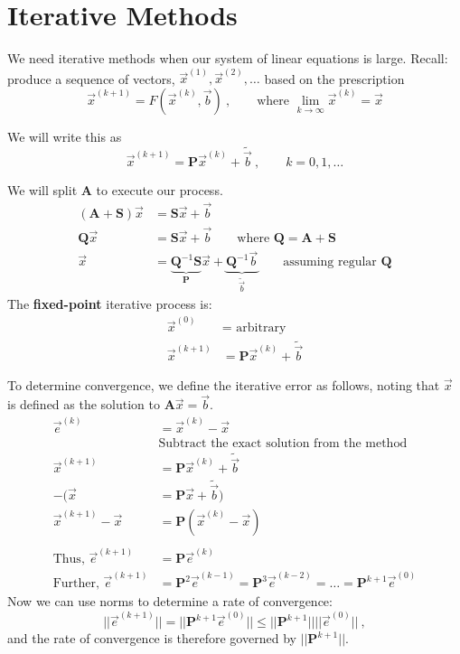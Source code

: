 \documentclass[12pt]{article}
\newcommand{\ve}[1]{\ensuremath{\mathbf{#1}}}
\begin{document}
\section*{Iterative Methods}
We need iterative methods when our system of linear equations is large. Recall: produce a sequence of vectors, $\vec{x}^{(1)}, \vec{x}^{(2)}, \dots$ based on the prescription
  \[\vec{x}^{(k+1)} = F(\vec{x}^{(k)}, \vec{b})\:, \qquad \text{where } \displaystyle \lim_{k \rightarrow \infty} \vec{x}^{(k)} = \vec{x}\] 

We will write this as \[\vec{x}^{(k+1)} = \ve{P}\vec{x}^{(k)} +  \tilde{\vec{b}}\:,\qquad k = 0, 1, \dots \]

We will split $\ve{A}$ to execute our process.
%
\begin{align}
(\ve{A} + \ve{S}) \vec{x} &= \ve{S}\vec{x} + \vec{b} \nonumber \\
%
\ve{Q} \vec{x} &= \ve{S}\vec{x} + \vec{b} 
\qquad\text{where } \ve{Q} = \ve{A} + \ve{S} \nonumber \\
%
\vec{x} &= \underbrace{\ve{Q}^{-1} \ve{S}}_{\ve{P}}\vec{x} + \underbrace{\ve{Q}^{-1} \vec{b}}_{\tilde{\vec{b}} }
\qquad\text{assuming regular } \ve{Q}\nonumber
\end{align}
%
The \textbf{fixed-point} iterative process is:
\begin{align}
\vec{x}^{(0)} &= \text{ arbitrary}\nonumber \\
\vec{x}^{(k+1)} &= \ve{P}\vec{x}^{(k)} + \tilde{\vec{b}} \nonumber
\end{align}

To determine convergence, we define the iterative error as follows, noting that $\vec{x}$ is defined as the solution to $\ve{A}\vec{x} = \vec{b}$. 
%
\begin{align}
\vec{e}^{(k)} &= \vec{x}^{(k)} - \vec{x} \nonumber \\
%
&\text{Subtract the exact solution from the method} \nonumber \\
%
\vec{x}^{(k+1)} &= \ve{P}\vec{x}^{(k)} + \tilde{\vec{b}} \nonumber \\
- (\vec{x} &= \ve{P}\vec{x} + \tilde{\vec{b}}) \nonumber \\
%
\vec{x}^{(k+1)} - \vec{x} &= \ve{P}(\vec{x}^{(k)} - \vec{x})\nonumber \\
%
\nonumber \\
%
\text{Thus, } \vec{e}^{(k+1)} &= \ve{P}\vec{e}^{(k)} \nonumber \\
%
\text{Further, } \vec{e}^{(k+1)} &= \ve{P}^2\vec{e}^{(k-1)} = \ve{P}^3\vec{e}^{(k-2)} = \dots = \ve{P}^{k+1}\vec{e}^{(0)}\nonumber
%
\end{align}
%
Now we can use norms  to determine a rate of convergence:
\[||\vec{e}^{(k+1)}|| = ||\ve{P}^{k+1}\vec{e}^{(0)}|| \leq ||\ve{P}^{k+1}|| ||\vec{e}^{(0)}||\:, \]
and the rate of convergence is therefore governed by $||\ve{P}^{k+1}||$.
\end{document}
